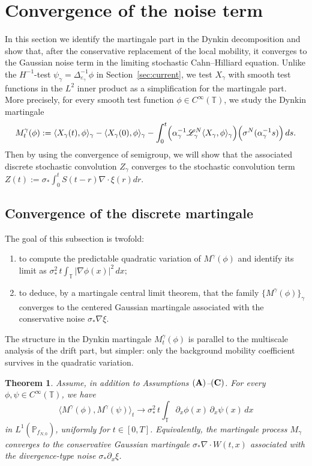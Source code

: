 \documentclass{article}
\newtheorem{theorem}{Theorem}
\begin{document}
\section{Convergence of the noise term}\label{sec:noise}

In this section we identify the martingale part in the Dynkin decomposition and show that,
after the conservative replacement of the local mobility, it converges to the Gaussian noise
term in the limiting stochastic Cahn--Hilliard equation. 
Unlike the \(H^{-1}\)-test \(\psi_\gamma=\Delta_{\varepsilon_\gamma}^{-1}\phi\) in Section~\ref{sec:current}, we test \( X_\gamma\) with smooth test functions in the \(L^2\) inner product as a simplification for the martingale part.
More precisely, for every smooth test function \(\phi\in C^\infty(\mathbb T)\), we study the Dynkin martingale
\[
M_t^\gamma(\phi)
:=
\langle X_\gamma(t),\phi\rangle_\gamma
-
\langle X_\gamma(0),\phi\rangle_\gamma
-
\int_0^t
\Bigl(\alpha_\gamma^{-1}\mathscr L_\gamma^N\langle X_\gamma,\phi\rangle_\gamma\Bigr)
\Bigl(\sigma^N(\alpha_\gamma^{-1}s)\Bigr)\,ds.
\]
Then by using the convergence of semigroup, we will show that the associated discrete stochastic convolution \(Z_\gamma\) converges to the stochastic convolution term
\(
Z(t):= \sigma_{*}\int_0^t S(t-r) \nabla \cdot\xi(r)dr.
\)

\subsection{Convergence of the discrete martingale}


The goal of this subsection is twofold:

\begin{enumerate}
\item[(i)] to compute the predictable quadratic variation of \(M^\gamma(\phi)\) and identify
its limit as
\(
\sigma_*^2\,t\int_{\mathbb T}|\nabla\phi(x)|^2\,dx;
\)
\item[(ii)] to deduce, by a martingale central limit theorem, that the family
\(\{M^\gamma(\phi)\}_\gamma\) converges to the centered Gaussian martingale associated with the
conservative noise \(\sigma_*\nabla\xi\).
\end{enumerate}

The structure in the Dynkin martingale $M_t^\gamma(\phi) $ is parallel to the multiscale analysis of the drift part, but simpler: only the background mobility coefficient survives in the quadratic variation.

\begin{theorem}\label{thm:martingale-bracket-corrected-rate}
Assume, in addition to Assumptions \(({\bf A})\)--\(({\bf C})\).
For every \(\phi,\psi\in C^\infty(\mathbb T)\), we have
\[
\langle M^\gamma(\phi),M^\gamma(\psi)\rangle_t
\longrightarrow
\sigma_*^2\,t\int_{\mathbb T}\partial_x\phi(x)\,\partial_x\psi(x)\,dx
\]
in \(L^1(\mathbb P_{f_{N,0}})\), uniformly for \(t\in[0,T]\).
Equivalently, the martingale process $M_{\gamma}$ converges to the conservative Gaussian martingale $\sigma_*\nabla\cdot W(t,x)$ associated with the divergence-type noise $\sigma_*\partial_x\xi$.
\end{theorem}
\end{document}
